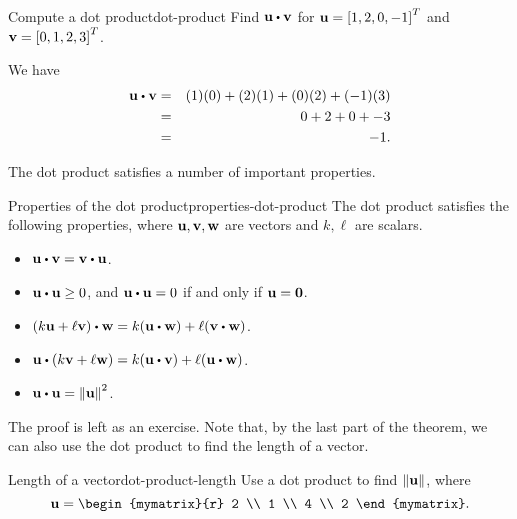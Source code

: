 \begin{example}{Compute a dot product}{dot-product}
  Find $\vect{u} \dotprod \vect{v}$ for $\mbox{\bf u}=\left[1,2,0,-1\right]^T$
  and $\mbox{\bf v}=\left[0,1,2,3\right]^T$.
\end{example}

\begin{solution}
  We have
  \begin{eqnarray*}
    \vect{u} \dotprod \vect{v}
    &=&
        (1)(0) + (2)(1) + (0)(2) + (-1)(3) \\
    &=&
        0 + 2 + 0 + -3 \\
    &=&
        -1.
  \end{eqnarray*}
\end{solution}

The dot product satisfies a number of important properties.

\begin{theorem}{Properties of the dot product}{properties-dot-product}
  The dot product satisfies the following properties, where
  $\mbox{\bf u},\mbox{\bf v},\mbox{\bf w}$ are vectors and $k,\ell$ are
  scalars.
  \begin{itemize}
  \item $\vect{u}\dotprod\vect{v}=\vect{v}\dotprod\vect{u}$.
  \item $\vect{u}\dotprod\vect{u}\geq 0$, and $\vect{u}\dotprod\vect{u}=0$ if and only if $\mbox{\bf u}=\mbox{\bf 0}$.
  \item $(k\vect{u}+\ell\vect{v})\dotprod\vect{w}=k(\vect{u}\dotprod\vect{w})+\ell(\vect{v}\dotprod\vect{w})$.
  \item $\vect{u}\dotprod(k\vect{v}+\ell\vect{w})
    =k(\vect{u}\dotprod \vect{v})+\ell(\vect{u}\dotprod\vect{w})$.
  \item $\vect{u}\dotprod\vect{u}=\norm{\vect{u}}^{2}$.
  \end{itemize}
\end{theorem}

The proof is left as an exercise. Note that, by the last part of the
theorem, we can also use the dot product to find the length of a
vector.

\begin{example}{Length of a vector}{dot-product-length}
  Use a dot product to find $\left\|\mbox{\bf u}\right\|$, where
  \begin{equation*}
    \vect{u}
    =
    \begin{mymatrix}{r}
      2 \\
      1 \\
      4 \\
      2
    \end{mymatrix}.
  \end{equation*}
\end{example}

